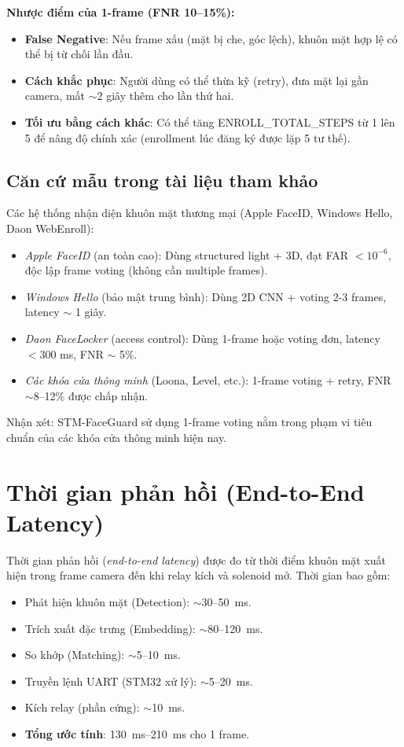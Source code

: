 \textbf{Nhược điểm của 1-frame (FNR 10--15\%):}
\begin{itemize}
  \item \textbf{False Negative}: Nếu frame xấu (mặt bị che, góc lệch), khuôn mặt hợp lệ có thể bị từ chối lần đầu.
  \item \textbf{Cách khắc phục}: Người dùng có thể thừa kỹ (retry), đưa mặt lại gần camera, mất $\sim 2$ giây thêm cho lần thứ hai.
  \item \textbf{Tối ưu bằng cách khác}: Có thể tăng ENROLL\_TOTAL\_STEPS từ 1 lên 5 để nâng độ chính xác (enrollment lúc đăng ký được lặp 5 tư thế).
\end{itemize}

\subsection{Căn cứ mẫu trong tài liệu tham khảo}

Các hệ thống nhận diện khuôn mặt thương mại (Apple FaceID, Windows Hello, Daon WebEnroll):
\begin{itemize}
  \item \textit{Apple FaceID} (an toàn cao): Dùng structured light + 3D, đạt FAR $< 10^{-6}$, độc lập frame voting (không cần multiple frames).
  \item \textit{Windows Hello} (bảo mật trung bình): Dùng 2D CNN + voting 2-3 frames, latency $\sim$ 1 giây.
  \item \textit{Daon FaceLocker} (access control): Dùng 1-frame hoặc voting đơn, latency $<300$ ms, FNR $\sim $ 5\%.
  \item \textit{Các khóa cửa thông minh} (Loona, Level, etc.): 1-frame voting + retry, FNR $\sim 8$--12\% được chấp nhận.
\end{itemize}

Nhận xét: STM-FaceGuard sử dụng 1-frame voting nằm trong phạm vi tiêu chuẩn của các khóa cửa thông minh hiện nay.

\section{Thời gian phản hồi (End-to-End Latency)}
\label{sec:latency}

Thời gian phản hồi (\textit{end-to-end latency}) được đo từ thời điểm khuôn mặt xuất hiện trong frame camera đến khi relay kích và solenoid mở. Thời gian bao gồm:

\begin{itemize}
  \item Phát hiện khuôn mặt (Detection): $\sim$30--50~ms.
  \item Trích xuất đặc trưng (Embedding): $\sim$80--120~ms.
  \item So khớp (Matching): $\sim$5--10~ms.
  \item Truyền lệnh UART (STM32 xử lý): $\sim$5--20~ms.
  \item Kích relay (phần cứng): $\sim$10~ms.
  \item \textbf{Tổng ước tính}: \SIrange{130}{210}{ms} cho 1 frame.
\end{itemize}

